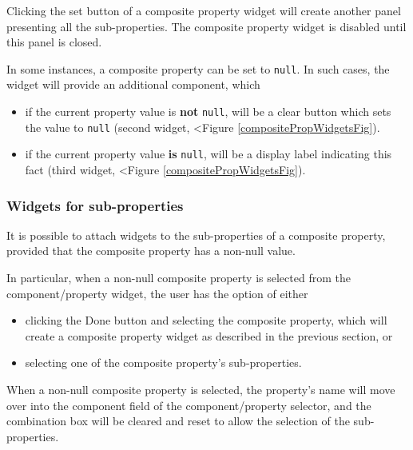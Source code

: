 \documentclass{article}
\begin{document}
Clicking the {\sf set} button of a composite property widget will create
another panel presenting all the sub-properties. The composite
property widget is disabled until this panel is closed.

In some instances, a composite property can be set to {\tt null}.  In such
cases, the widget will provide an additional component, which

\begin{itemize}

\item if the current property value is {\bf not} {\tt null}, will be a 
{\sf clear} button which sets the value to {\tt null} 
(second widget, <Figure \ref{compositePropWidgetsFig}).

\item if the current property value {\bf is} {\tt null}, will be a display label
indicating this fact (third widget, <Figure \ref{compositePropWidgetsFig}).

\end{itemize}

\subsubsection{Widgets for sub-properties}

It is possible to attach widgets to the sub-properties of a 
composite property, provided that the composite property 
has a non-null value.

In particular, when a non-null composite property is selected from the
component/property widget, the user has the option of either

\begin{itemize}

\item clicking the {\sf Done} button and selecting the composite property,
which will create a composite property widget as described in the
previous section, or

\item selecting one of the composite property's sub-properties.

\end{itemize}

When a non-null composite property is selected, the property's name
will move over into the component field of the component/property
selector, and the combination box will be cleared and reset to allow
the selection of the sub-properties.
\end{document}
